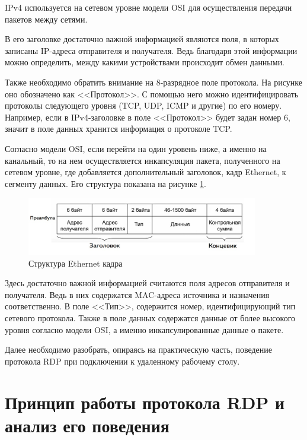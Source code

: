 \documentclass[bachelor, och, coursework]{SCWorks}
\begin{document}
    IPv4 используется на сетевом уровне модели OSI для осуществления передачи пакетов между сетями.

    В его заголовке достаточно важной информацией являются поля, в которых записаны IP-адреса отправителя и получателя. Ведь благодаря этой информации можно
    определить, между какими устройствами происходит обмен данными.

    Также необходимо обратить внимание на 8-разрядное поле протокола. На рисунке оно обозначено как <<Протокол>>. С помощью него можно 
    идентифицировать протоколы следующего уровня (TCP, UDP, ICMP и другие) по его номеру. Например, если в IPv4-заголовке в поле <<Протокол>> 
    будет задан номер 6, значит в поле данных хранится информация о протоколе TCP.
    
    Согласно модели OSI, если перейти на один уровень ниже, а именно на канальный, то на нем осуществляется инкапсуляция пакета, полученного на сетевом уровне, где
    добавляется дополнительный заголовок, кадр Ethernet, к сегменту данных. Его структура показана на рисунке \ref{eth-frame}.

    \begin{figure}[H]
      \centering
      \includegraphics[width=0.9\textwidth]{photo/eth-frame.jpg}
      \caption{Структура Ethernet кадра}
      \label{eth-frame}
    \end{figure}

    Здесь достаточно важной информацией считаются поля адресов отправителя и получателя.
    Ведь в них содержатся MAC-адреса источника и назначения соответственно.
    В поле <<Тип>>, содержится номер, идентифицирующий тип сетевого протокола. 
    Также в поле данных содержатся данные от более высокого уровня согласно модели OSI, а именно инкапсулированные данные о пакете.

    Далее необходимо разобрать, опираясь на практическую часть, поведение протокола RDP при подключении к удаленному рабочему столу.

\section{Принцип работы протокола RDP и анализ его поведения}
\end{document}
